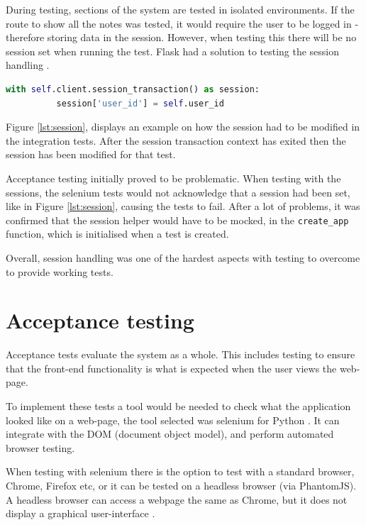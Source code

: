 During testing, sections of the system are tested in isolated environments. If the route to show all the notes was tested, it would require the user to be logged in - therefore storing data in the session. However, when testing this there will be no session set when running the test. Flask had a solution to testing the session handling \cite{citeulike:14020609}.

\begin{lstlisting}[language=python, label={lst:session}, breaklines, columns=fullflexible, keywordstyle=\color{blue}, basicstyle=\normalsize\ttfamily, caption= {An example of how sessions were handled and modified in the tests.}]
  with self.client.session_transaction() as session:
          session['user_id'] = self.user_id
\end{lstlisting}

Figure \ref{lst:session}, displays an example on how the session had to be modified in the integration tests. After the session transaction context has exited then the session has been modified for that test.

Acceptance testing initially proved to be problematic. When testing with the sessions, the selenium tests would not acknowledge that a session had been set, like in Figure \ref{lst:session}, causing the tests to fail. After a lot of problems, it was confirmed that the session helper would have to be mocked, in the \lstinline[basicstyle=\normalsize\ttfamily]{create_app} function, which is initialised when a test is created.

Overall, session handling was one of the hardest aspects with testing to overcome to provide working tests.

\section{Acceptance testing}
Acceptance tests evaluate the system as a whole. This includes testing to ensure that the front-end functionality is what is expected when the user views the web-page.

To implement these tests a tool would be needed to check what the application looked like on a web-page, the tool selected was selenium for Python \cite{citeulike:14020625}. It can integrate with the DOM (document object model), and perform automated browser testing.

When testing with selenium there is the option to test with a standard browser, Chrome, Firefox etc, or it can be tested on a headless browser (via PhantomJS). A headless browser can access a webpage the same as Chrome, but it does not display a graphical user-interface \cite{citeulike:13983611}.


